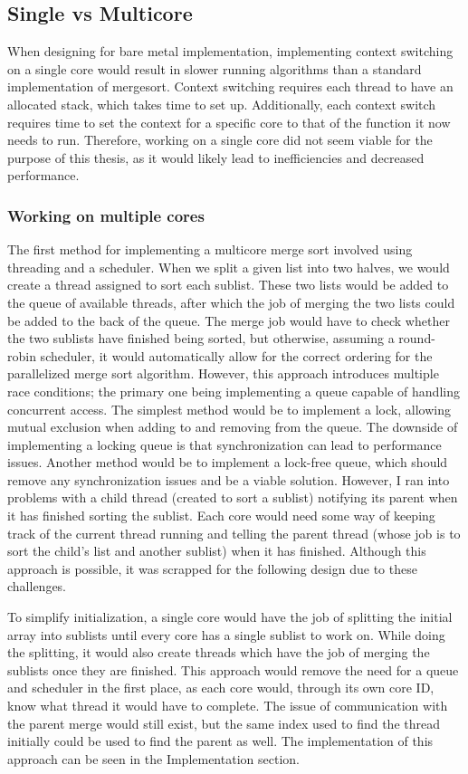 \subsection{Single vs Multicore}
 When designing for bare metal implementation, implementing context switching on
 a single core would result in slower running algorithms than a standard
 implementation of mergesort. Context switching requires each thread to have an
 allocated stack, which takes time to set up. Additionally, each context switch
 requires time to set the context for a specific core to that of the function it
 now needs to run. Therefore, working on a single core did not seem viable for
 the purpose of this thesis, as it would likely lead to inefficiencies and
 decreased performance.

\subsubsection{Working on multiple cores}
The first method for implementing a multicore merge sort involved using
threading and a scheduler. When we split a given list into two halves, we would
create a thread assigned to sort each sublist. These two lists would be added to
the queue of available threads, after which the job of merging the two lists
could be added to the back of the queue. The merge job would have to check
whether the two sublists have finished being sorted, but otherwise, assuming a
round-robin scheduler, it would automatically allow for the correct ordering for
the parallelized merge sort algorithm. However, this approach introduces
multiple race conditions; the primary one being implementing a queue capable of
handling concurrent access. The simplest method would be to implement a lock,
allowing mutual exclusion when adding to and removing from the queue. The
downside of implementing a locking queue is that synchronization can lead to
performance issues. Another method would be to implement a lock-free queue,
which should remove any synchronization issues and be a viable solution.
However, I ran into problems with a child thread (created to sort a sublist)
notifying its parent when it has finished sorting the sublist. Each core would
need some way of keeping track of the current thread running and telling the
parent thread (whose job is to sort the child's list and another sublist) when
it has finished. Although this approach is possible, it was scrapped for the
following design due to these challenges.

To simplify initialization, a single core would have the job of splitting the
initial array into sublists until every core has a single sublist to work on.
While doing the splitting, it would also create threads which have the job of
merging the sublists once they are finished. This approach would remove the need
for a queue and scheduler in the first place, as each core would, through its
own core ID, know what thread it would have to complete. The issue of
communication with the parent merge would still exist, but the same index used
to find the thread initially could be used to find the parent as well. The
implementation of this approach can be seen in the Implementation section.


